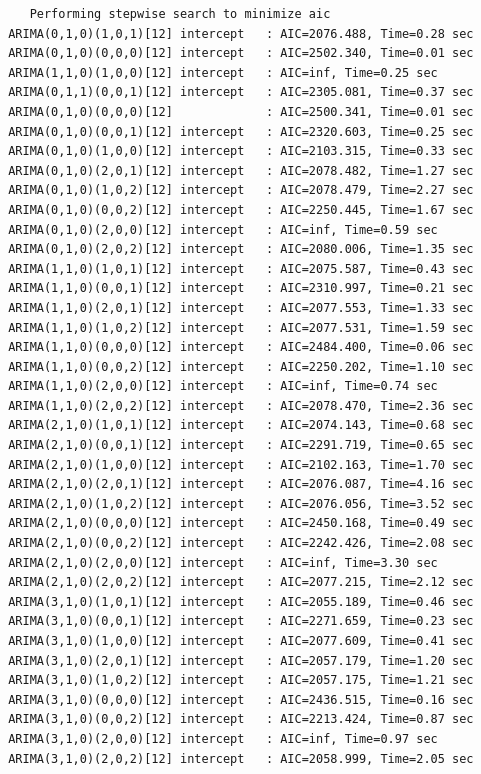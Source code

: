\documentclass[a4paper, 12pt]{article}
\begin{document}
\begin{verbatim}
    Performing stepwise search to minimize aic
 ARIMA(0,1,0)(1,0,1)[12] intercept   : AIC=2076.488, Time=0.28 sec
 ARIMA(0,1,0)(0,0,0)[12] intercept   : AIC=2502.340, Time=0.01 sec
 ARIMA(1,1,0)(1,0,0)[12] intercept   : AIC=inf, Time=0.25 sec
 ARIMA(0,1,1)(0,0,1)[12] intercept   : AIC=2305.081, Time=0.37 sec
 ARIMA(0,1,0)(0,0,0)[12]             : AIC=2500.341, Time=0.01 sec
 ARIMA(0,1,0)(0,0,1)[12] intercept   : AIC=2320.603, Time=0.25 sec
 ARIMA(0,1,0)(1,0,0)[12] intercept   : AIC=2103.315, Time=0.33 sec
 ARIMA(0,1,0)(2,0,1)[12] intercept   : AIC=2078.482, Time=1.27 sec
 ARIMA(0,1,0)(1,0,2)[12] intercept   : AIC=2078.479, Time=2.27 sec
 ARIMA(0,1,0)(0,0,2)[12] intercept   : AIC=2250.445, Time=1.67 sec
 ARIMA(0,1,0)(2,0,0)[12] intercept   : AIC=inf, Time=0.59 sec
 ARIMA(0,1,0)(2,0,2)[12] intercept   : AIC=2080.006, Time=1.35 sec
 ARIMA(1,1,0)(1,0,1)[12] intercept   : AIC=2075.587, Time=0.43 sec
 ARIMA(1,1,0)(0,0,1)[12] intercept   : AIC=2310.997, Time=0.21 sec
 ARIMA(1,1,0)(2,0,1)[12] intercept   : AIC=2077.553, Time=1.33 sec
 ARIMA(1,1,0)(1,0,2)[12] intercept   : AIC=2077.531, Time=1.59 sec
 ARIMA(1,1,0)(0,0,0)[12] intercept   : AIC=2484.400, Time=0.06 sec
 ARIMA(1,1,0)(0,0,2)[12] intercept   : AIC=2250.202, Time=1.10 sec
 ARIMA(1,1,0)(2,0,0)[12] intercept   : AIC=inf, Time=0.74 sec
 ARIMA(1,1,0)(2,0,2)[12] intercept   : AIC=2078.470, Time=2.36 sec
 ARIMA(2,1,0)(1,0,1)[12] intercept   : AIC=2074.143, Time=0.68 sec
 ARIMA(2,1,0)(0,0,1)[12] intercept   : AIC=2291.719, Time=0.65 sec
 ARIMA(2,1,0)(1,0,0)[12] intercept   : AIC=2102.163, Time=1.70 sec
 ARIMA(2,1,0)(2,0,1)[12] intercept   : AIC=2076.087, Time=4.16 sec
 ARIMA(2,1,0)(1,0,2)[12] intercept   : AIC=2076.056, Time=3.52 sec
 ARIMA(2,1,0)(0,0,0)[12] intercept   : AIC=2450.168, Time=0.49 sec
 ARIMA(2,1,0)(0,0,2)[12] intercept   : AIC=2242.426, Time=2.08 sec
 ARIMA(2,1,0)(2,0,0)[12] intercept   : AIC=inf, Time=3.30 sec
 ARIMA(2,1,0)(2,0,2)[12] intercept   : AIC=2077.215, Time=2.12 sec
 ARIMA(3,1,0)(1,0,1)[12] intercept   : AIC=2055.189, Time=0.46 sec
 ARIMA(3,1,0)(0,0,1)[12] intercept   : AIC=2271.659, Time=0.23 sec
 ARIMA(3,1,0)(1,0,0)[12] intercept   : AIC=2077.609, Time=0.41 sec
 ARIMA(3,1,0)(2,0,1)[12] intercept   : AIC=2057.179, Time=1.20 sec
 ARIMA(3,1,0)(1,0,2)[12] intercept   : AIC=2057.175, Time=1.21 sec
 ARIMA(3,1,0)(0,0,0)[12] intercept   : AIC=2436.515, Time=0.16 sec
 ARIMA(3,1,0)(0,0,2)[12] intercept   : AIC=2213.424, Time=0.87 sec
 ARIMA(3,1,0)(2,0,0)[12] intercept   : AIC=inf, Time=0.97 sec
 ARIMA(3,1,0)(2,0,2)[12] intercept   : AIC=2058.999, Time=2.05 sec

\end{verbatim}
\end{document}

